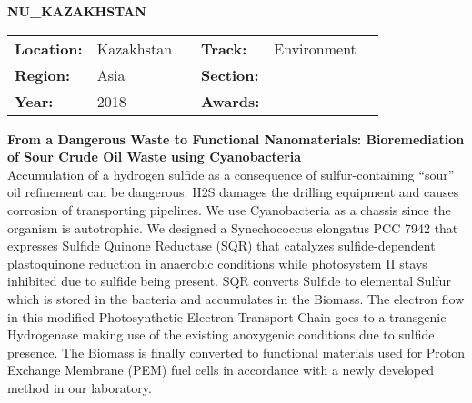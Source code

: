 \textbf{\uppercase{NU\_Kazakhstan}} \FloatBarrier \begin{table}[h] \begin{tabular}{lp{2.5cm}llll} \textbf{Location:} & Kazakhstan & \multicolumn{1}{|l}{} & \textbf{Track:}   & Environment \\ \textbf{Region:}   & Asia   & \multicolumn{1}{|l}{} & \textbf{Section:} &  \\ \textbf{Year:}     & 2018   & \multicolumn{1}{|l}{} & \textbf{Awards:}  & \end{tabular} \end{table} \FloatBarrier \noindent\textbf{From a Dangerous Waste to Functional Nanomaterials: Bioremediation of Sour Crude Oil Waste using Cyanobacteria} \vspace{.2cm}\\ 
Accumulation of a hydrogen sulfide as a consequence of sulfur-containing “sour” oil refinement can be dangerous. H2S damages the drilling equipment and causes corrosion of transporting pipelines. We use Cyanobacteria as a chassis since the organism is autotrophic. We designed a Synechococcus elongatus PCC 7942 that expresses Sulfide Quinone Reductase (SQR) that catalyzes sulfide-dependent plastoquinone reduction in anaerobic conditions while photosystem II stays inhibited due to sulfide being present. SQR converts Sulfide to elemental Sulfur which is stored in the bacteria and accumulates in the Biomass. The electron flow in this modified Photosynthetic Electron Transport Chain goes to a transgenic Hydrogenase making use of the existing anoxygenic conditions due to sulfide presence. The Biomass is finally converted to functional materials used for Proton Exchange Membrane (PEM) fuel cells in accordance with a newly developed method in our laboratory.
\vspace{2cm} $ $
\pagebreak

